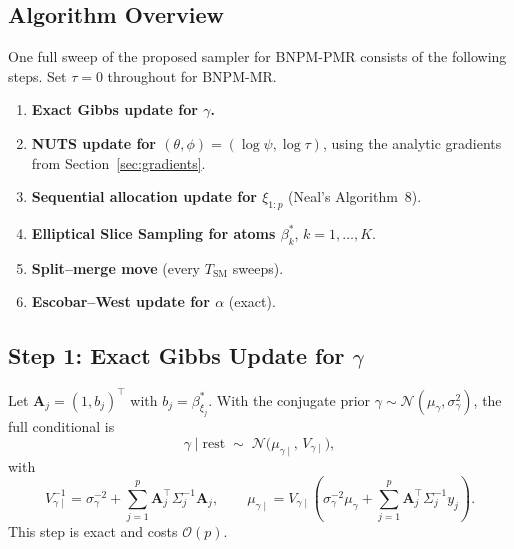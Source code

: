 \documentclass[12pt, a4paper]{article}
\theoremstyle{remark}
\newcommand{\Nor}{\mathcal{N}}
\begin{document}
\subsection{Algorithm Overview}

One full sweep of the proposed sampler for BNPM-PMR consists of the
following steps.  Set $\tau = 0$ throughout for BNPM-MR.

\begin{enumerate}[label=\textbf{Step \arabic*.}, leftmargin=*, itemsep=6pt]
  \item \textbf{Exact Gibbs update for $\gamma$.}
  \item \textbf{NUTS update for $(\theta,\phi) = (\log\psi, \log\tau)$},
        using the analytic gradients from Section~\ref{sec:gradients}.
  \item \textbf{Sequential allocation update for $\xi_{1:p}$}
        (Neal's Algorithm~8).
  \item \textbf{Elliptical Slice Sampling for atoms $\beta_k^*$},
        $k=1,\ldots,K$.
  \item \textbf{Split--merge move} (every $T_{\mathrm{SM}}$ sweeps).
  \item \textbf{Escobar--West update for $\alpha$} (exact).
\end{enumerate}

\subsection{Step 1: Exact Gibbs Update for \texorpdfstring{$\gamma$}{gamma}}

Let $\mathbf{A}_j = (1, b_j)^\top$ with $b_j = \beta_{\xi_j}^*$.
With the conjugate prior $\gamma \sim \Nor(\mu_\gamma, \sigma_\gamma^2)$,
the full conditional is
\begin{equation}
  \gamma \mid \mathrm{rest}
  \;\sim\;
  \Nor\!\bigl(\mu_{\gamma\mid},\, V_{\gamma\mid}\bigr),
\end{equation}
with
\begin{equation}
  V_{\gamma\mid}^{-1}
  = \sigma_\gamma^{-2} + \sum_{j=1}^p \mathbf{A}_j^\top \Sigma_j^{-1} \mathbf{A}_j,
  \qquad
  \mu_{\gamma\mid}
  = V_{\gamma\mid}\!\left(\sigma_\gamma^{-2}\mu_\gamma
    + \sum_{j=1}^p \mathbf{A}_j^\top \Sigma_j^{-1} y_j\right).
\end{equation}
This step is exact and costs $\mathcal{O}(p)$.
\end{document}

